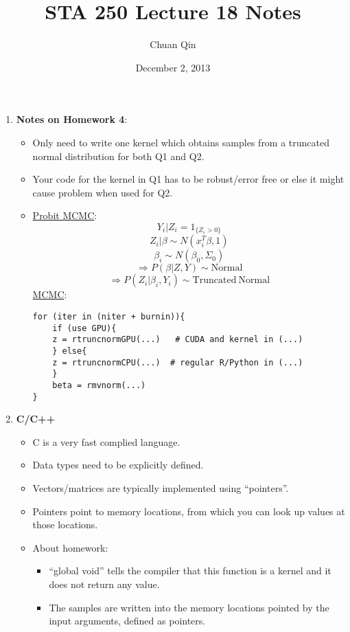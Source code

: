 \documentclass[11pt, oneside]{article}   	%
\title{STA 250 Lecture 18 Notes}
\author{Chuan Qin}
\date{December 2, 2013}							%
\begin{document}
\maketitle
\begin{enumerate}
\item \textbf{Notes on Homework 4}:
\begin{itemize}
\item Only need to write one kernel which obtains samples from a truncated normal distribution for both Q1 and Q2.
\item Your code for the kernel in Q1 has to be robust/error free or else it might cause problem when used for Q2.
\item \underline{Probit MCMC}:
\[
Y_i | Z_i = 1_{\{Z_i>0\}}
\]
\[
Z_i | \beta \sim N(x_i^T\beta,1)
\]
\[
\beta_i \sim N(\beta_0,\Sigma_0)
\]
\[
\Rightarrow P(\beta | Z,Y) \sim \mathrm{Normal}
\]
\[
\Rightarrow P(Z_i | \beta_i,Y_i) \sim \mathrm{Truncated \ Normal}
\]
\underline{MCMC}:
\begin{center}
\begin{verbatim}
for (iter in (niter + burnin)){
    if (use GPU){
    z = rtruncnormGPU(...)   # CUDA and kernel in (...)
    } else{
    z = rtruncnormCPU(...)  # regular R/Python in (...)
    }
    beta = rmvnorm(...)
}
\end{verbatim}
\end{center}
\end{itemize}
\vspace{1cm}

\item \textbf{C/C++}
\begin{itemize}
\item C is a very fast complied language.
\item Data types need to be explicitly defined.
\item Vectors/matrices are typically implemented using ``pointers''.
\item Pointers point to memory locations, from which you can look up values at those locations.
\item About homework: \begin{itemize}
\item ``\underline{\hspace{0.4cm}}global\underline{\hspace{0.4cm}} void'' tells the compiler that this function is a kernel and it does not return any value.
\item The samples are written into the memory locations pointed by the input arguments, defined as pointers.
\end{itemize}
\end{itemize}
\vspace{1cm}


\end{enumerate}
\end{document}
